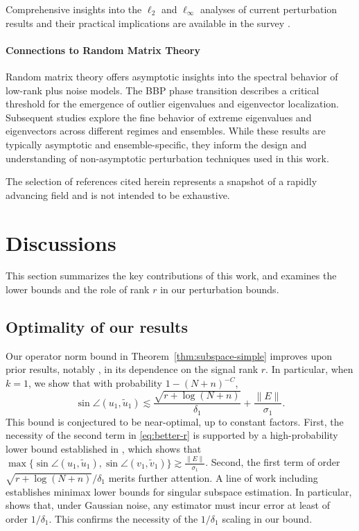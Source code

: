 \documentclass[reqno]{amsart}
\theoremstyle{plain}
\theoremstyle{definition}
\begin{document}
Comprehensive insights into the $\ell_2$ and $\ell_{\infty}$ analyses of current perturbation results and their practical implications are available in the survey \cite{CCFM21}.

\paragraph*{Connections to Random Matrix Theory}
Random matrix theory offers asymptotic insights into the spectral behavior of low-rank plus noise models. The BBP phase transition \cite{BBP05} describes a critical threshold for the emergence of outlier eigenvalues and eigenvector localization. Subsequent studies \cite{DP07, BGN, BGN1, BS06, El07, BY08, BGM11, BEKYY2016, CM2017, CD18, BDWW20, BDW21, FFHL19, BW21, Ben20} explore the fine behavior of extreme eigenvalues and eigenvectors across different regimes and ensembles. While these results are typically asymptotic and ensemble-specific, they inform the design and understanding of non-asymptotic perturbation techniques used in this work.

The selection of references cited herein represents a snapshot of a rapidly advancing field and is not intended to be exhaustive. 


\section{Discussions}\label{sec:dis}
This section summarizes the key contributions of this work, and examines the lower bounds and the role of rank $r$ in our perturbation bounds.
\subsection{Optimality of our results}\label{sec:optimality}
Our operator norm bound in Theorem~\ref{thm:subspace-simple} improves upon prior results, notably \cite{OVW2}, in its dependence on the signal rank $r$. In particular, when $k=1$, we show that with probability $1-(N+n)^{-C}$,
\begin{equation}\label{eq:better-r}
\sin \angle ( u_1, \widetilde{u}_1) \lesssim \frac{\sqrt{r +\log(N+n)}}{\delta_1} + \frac{\|E\|}{\sigma_1}.
\end{equation}
This bound is conjectured to be near-optimal, up to constant factors.  First, the necessity of the second term in \eqref{eq:better-r} is supported by a high-probability lower bound established in \cite[Theorem~3]{OVW22}, which shows that $\max\{\sin \angle ( u_1, \widetilde{u}_1), \sin \angle ( v_1, \widetilde{v}_1)\} \gtrsim \frac{\|E\|}{\sigma_1}$. Second, the first term of order ${\sqrt{r +\log(N+n)}}/{\delta_1}$ merits further attention. A line of work including \cite{CZ18, CFMW19, CLCPC21, LCPC21, CCFM21, CWC21} establishes minimax lower bounds for singular subspace estimation.  In particular, \cite[Theorem~3]{CWC21} shows that, under Gaussian noise, any estimator must incur error at least of order $1/\delta_1$. This confirms the necessity of the $1/\delta_1$ scaling in our bound.
\end{document}
